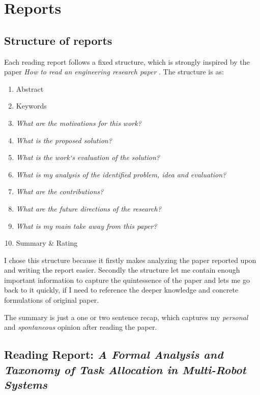 


    \chapter{Reports}

    \section*{Structure of reports}

    Each reading report follows a fixed structure, which is strongly inspired by the paper \emph{How to read an engineering research paper} \cite{Griswold2009}.
    The structure is as: \ \begin{enumerate}
        \item Abstract
        \item Keywords
        \item \emph{What are the motivations for this work?}
        \item \emph{What is the proposed solution?}
        \item \emph{What is the work‘s evaluation of the solution?}
        \item \emph{What is my analysis of the identified problem, idea and evaluation?}
        \item \emph{What are the contributions?}
        \item \emph{What are the future directions of the research?}
        \item \emph{What is my main take away from this paper?}
        \item Summary \& Rating
    \end{enumerate}

    I chose this structure because it firstly makes analyzing the paper reported upon and writing the report easier. Secondly the structure let me contain enough important information to capture the quintessence of the paper and lets me go back to it quickly, if I need to reference the deeper knowledge and concrete formulations of original paper.

    The summary is just a one or two sentence recap, which captures my \emph{personal} and \emph{spontaneous} opinion after reading the paper. 
    
 
    \newpage
    \section{Reading Report: \emph{A Formal Analysis and Taxonomy of Task Allocation in Multi-Robot Systems}}
    \label{sec:Gerkey2004}
    \cite{Gerkey2004}
    
